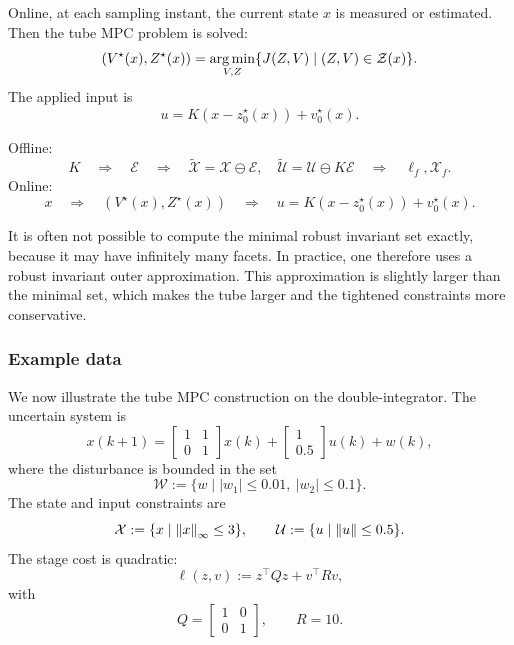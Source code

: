 Online, at each sampling instant, the current state \(x\) is measured or estimated. Then the
tube MPC problem is solved:
\[
    (V^\star(x),Z^\star(x))
    =
    \operatorname*{arg\,min}_{V,Z}
    \{J(Z,V)\mid (Z,V)\in\mathcal Z(x)\}.
\]
The applied input is
\[
    u=K(x-z_0^\star(x))+v_0^\star(x).
\]

\begin{theorembox}
Offline:
\[
    K
    \quad\Longrightarrow\quad
    \mathcal E
    \quad\Longrightarrow\quad
    \widetilde{\mathcal X}=\mathcal X\ominus\mathcal E,\quad
    \widetilde{\mathcal U}=\mathcal U\ominus K\mathcal E
    \quad\Longrightarrow\quad
    \ell_f,\mathcal X_f.
\]
Online:
\[
    x
    \quad\Longrightarrow\quad
    (V^\star(x),Z^\star(x))
    \quad\Longrightarrow\quad
    u=K(x-z_0^\star(x))+v_0^\star(x).
\]
\end{theorembox}

\begin{remark}
It is often not possible to compute the minimal robust invariant set exactly, because it may have
infinitely many facets. In practice, one therefore uses a robust invariant outer approximation.
This approximation is slightly larger than the minimal set, which makes the tube larger and the
tightened constraints more conservative.
\end{remark}

\subsubsection{Example data}

We now illustrate the tube MPC construction on the double-integrator. The uncertain system is
\[
    x(k+1)
    =
    \begin{bmatrix}
        1 & 1\\
        0 & 1
    \end{bmatrix}x(k)
    +
    \begin{bmatrix}
        1\\
        0.5
    \end{bmatrix}u(k)
    +
    w(k),
\]
where the disturbance is bounded in the set
\[
    \mathcal W
    :=
    \{w\mid |w_1|\leq 0.01,\ |w_2|\leq 0.1\}.
\]
The state and input constraints are
\[
    \mathcal X
    :=
    \{x\mid \left\lVert x \right\rVert_\infty\leq 3\},
    \qquad
    \mathcal U
    :=
    \{u\mid \left\lVert u \right\rVert\leq 0.5\}.
\]
The stage cost is quadratic:
\[
    \ell(z,v)
    :=
    z^\top Qz+v^\top Rv,
\]
with
\[
    Q=
    \begin{bmatrix}
        1 & 0\\
        0 & 1
    \end{bmatrix},
    \qquad
    R=10.
\]

